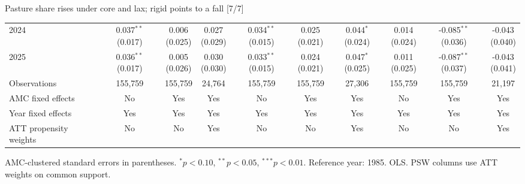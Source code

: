 \documentclass[aspectratio=169]{beamer}
\begin{document}
\begin{frame}{Pasture share rises under core and lax; rigid points to a fall [7/7]}
{\begin{tabular}{@{}l*{9}{c}@{}}
2024 & \shortstack{0.037$^{**}$\\(0.017)} & \shortstack{0.006\\(0.025)} & \shortstack{0.027\\(0.029)} & \shortstack{0.034$^{**}$\\(0.015)} & \shortstack{0.025\\(0.021)} & \shortstack{0.044$^{*}$\\(0.024)} & \shortstack{0.014\\(0.024)} & \shortstack{-0.085$^{**}$\\(0.036)} & \shortstack{-0.043\\(0.040)} \\
2025 & \shortstack{0.036$^{**}$\\(0.017)} & \shortstack{0.005\\(0.026)} & \shortstack{0.030\\(0.030)} & \shortstack{0.033$^{**}$\\(0.015)} & \shortstack{0.024\\(0.021)} & \shortstack{0.047$^{*}$\\(0.025)} & \shortstack{0.011\\(0.025)} & \shortstack{-0.087$^{**}$\\(0.037)} & \shortstack{-0.043\\(0.041)} \\
\midrule
Observations & 155,759 & 155,759 & 24,764 & 155,759 & 155,759 & 27,306 & 155,759 & 155,759 & 21,197 \\
AMC fixed effects & No & Yes & Yes & No & Yes & Yes & No & Yes & Yes \\
Year fixed effects & Yes & Yes & Yes & Yes & Yes & Yes & Yes & Yes & Yes \\
ATT propensity weights & No & No & Yes & No & No & Yes & No & No & Yes \\
\bottomrule
\end{tabular}%
}
\vspace{0.1em}
{\tiny\color{ZMidGray} AMC-clustered standard errors in parentheses. $^{*}p<0.10$, $^{**}p<0.05$, $^{***}p<0.01$. Reference year: 1985. OLS. PSW columns use ATT weights on common support.}
\end{frame}
\end{document}
